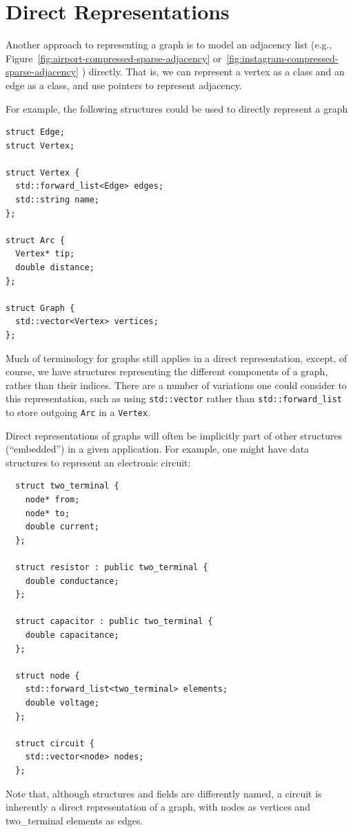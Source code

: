 \section{Direct Representations}

Another approach to representing a graph is to model an adjacency list (e.g., Figure~\ref{fig:airport-compressed-sparse-adjacency} or~\ref{fig:instagram-compressed-sparse-adjacency} ) directly.  That is, we can represent a vertex as a class and an edge as a class, and use pointers to represent adjacency.

For example, the following structures could be used to directly represent a graph 
\begin{lstlisting}
struct Edge;
struct Vertex;

struct Vertex {
  std::forward_list<Edge> edges;
  std::string name;
};

struct Arc {
  Vertex* tip;
  double distance;
};

struct Graph {
  std::vector<Vertex> vertices;
};
\end{lstlisting}  

Much of terminology for graphs still applies in a direct representation, except, of course, we have structures representing the different components of a graph, rather than their indices.  There are a number of variations one could consider to this representation, such as using \lstinline{std::vector} rather than \lstinline{std::forward_list} to store outgoing \lstinline{Arc} in a \lstinline{Vertex}.

Direct representations of graphs will often be implicitly part of other structures (``embedded'') in a given application.
For example,
one might have data structures to represent an electronic circuit:
\begin{lstlisting}
  struct two_terminal {
    node* from;
    node* to;
    double current;
  };

  struct resistor : public two_terminal {
    double conductance;
  };

  struct capacitor : public two_terminal {
    double capacitance;
  };

  struct node {
    std::forward_list<two_terminal> elements;
    double voltage;
  };

  struct circuit {
    std::vector<node> nodes;
  };
\end{lstlisting}
Note that, although structures and fields are differently named, a circuit is inherently a direct representation of a graph, with nodes as vertices and two\_terminal elements as edges.



